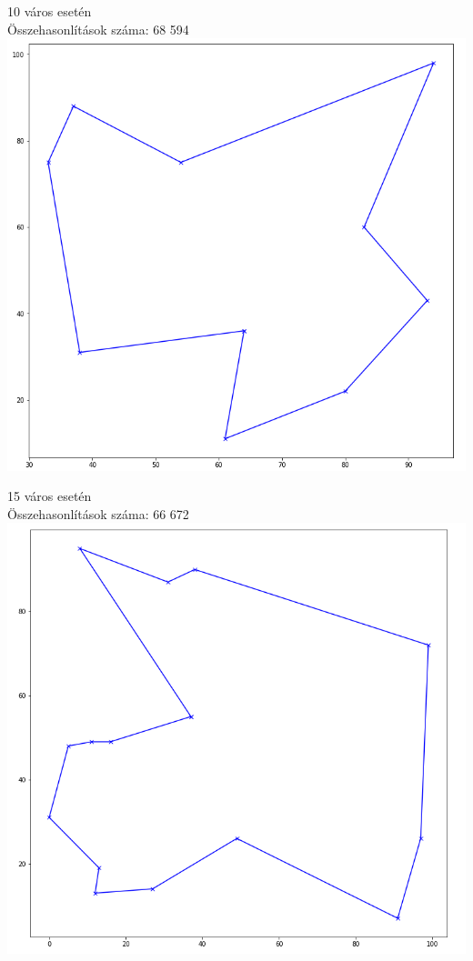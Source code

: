 \documentclass[12pt,a4paper]{article}
\begin{document}
\begin{flushleft}
10 város esetén \\
Összehasonlítások száma: 68 594
\includegraphics[scale=0.4]{10.png}
\end{flushleft}

\begin{flushleft}
15 város esetén \\
Összehasonlítások száma: 66 672
\includegraphics[scale=0.4]{15.png}
\end{flushleft}
\end{document}
